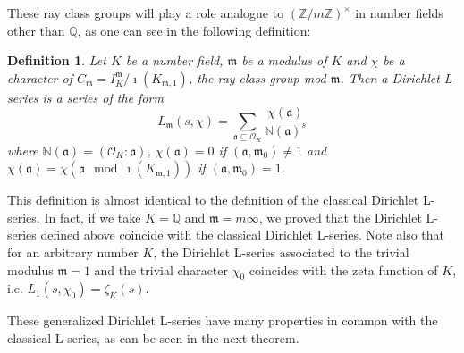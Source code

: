 \documentclass[]{amsart}
\newtheorem{defn}{Definition}
\newcommand{\Z}{\mathbb{Z}}
\newcommand{\Q}{\mathbb{Q}}
\newcommand{\m}{\mathfrak{m}}
\newcommand{\IKm}{I^\mathfrak{m}_K}
\newcommand{\Kmo}{K_{\mathfrak{m},1}}
\renewcommand{\a}{\mathfrak{a}}
\newcommand{\OK}{\mathcal{O}_K}
\newcommand{\N}{\mathbb{N}}
\newcommand{\Lms}{L_\mathfrak{m}(s,\chi)}
\begin{document}
	These ray class groups will play a role analogue to $(\Z/m\Z)^\times$ in number fields other than $\Q$, as one can see in the following definition:
	
	\begin{defn}
		Let $K$ be a number field, $\m$ be a modulus of $K$ and $\chi$ be a character of $C_\m=\IKm/\imath(\Kmo)$, the ray class group mod $\m$. Then a Dirichlet L-series is a series of the form 
		\[\Lms=\sum_{\a\subseteq\OK}\frac{\chi(\a)}{\N(\a)^{s}}\]
		where $\N(\a)=(\OK:\a)$, $\chi(\a)=0$ if $(\a,\m_0)\neq 1$ and $\chi(\a)=\chi(\a\mod{\imath(\Kmo)})$ if $(\a,\m_0)=1$. 
	\end{defn}
	
	This definition is almost identical to the definition of the classical Dirichlet L-series. In fact, if we take $K=\Q$ and $\m=m\infty$, we proved that the Dirichlet L-series defined above coincide with the classical Dirichlet L-series. Note also that for an arbitrary number $K$, the Dirichlet L-series associated to the trivial modulus $\m=1$ and the trivial character $\chi_0$ coincides with the zeta function of $K$, i.e. $L_1(s,\chi_0)=\zeta_K(s)$.
	
	These generalized Dirichlet L-series have many properties in common with the classical L-series, as can be seen in the next theorem.
	
\end{document}

